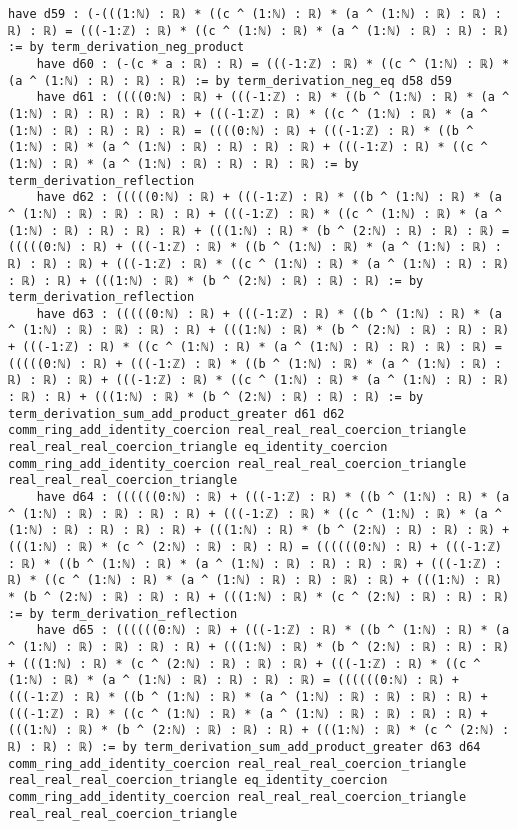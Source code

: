 \documentclass{article}
\begin{document}
\begin{tcolorbox}[colback=white!10, width=\linewidth]
\begin{lstlisting}[language=Lean4]
    have d59 : (-(((1:ℕ) : ℝ) * ((c ^ (1:ℕ) : ℝ) * (a ^ (1:ℕ) : ℝ) : ℝ) : ℝ) : ℝ) = (((-1:ℤ) : ℝ) * ((c ^ (1:ℕ) : ℝ) * (a ^ (1:ℕ) : ℝ) : ℝ) : ℝ) := by term_derivation_neg_product
    have d60 : (-(c * a : ℝ) : ℝ) = (((-1:ℤ) : ℝ) * ((c ^ (1:ℕ) : ℝ) * (a ^ (1:ℕ) : ℝ) : ℝ) : ℝ) := by term_derivation_neg_eq d58 d59
    have d61 : ((((0:ℕ) : ℝ) + (((-1:ℤ) : ℝ) * ((b ^ (1:ℕ) : ℝ) * (a ^ (1:ℕ) : ℝ) : ℝ) : ℝ) : ℝ) + (((-1:ℤ) : ℝ) * ((c ^ (1:ℕ) : ℝ) * (a ^ (1:ℕ) : ℝ) : ℝ) : ℝ) : ℝ) = ((((0:ℕ) : ℝ) + (((-1:ℤ) : ℝ) * ((b ^ (1:ℕ) : ℝ) * (a ^ (1:ℕ) : ℝ) : ℝ) : ℝ) : ℝ) + (((-1:ℤ) : ℝ) * ((c ^ (1:ℕ) : ℝ) * (a ^ (1:ℕ) : ℝ) : ℝ) : ℝ) : ℝ) := by term_derivation_reflection
    have d62 : (((((0:ℕ) : ℝ) + (((-1:ℤ) : ℝ) * ((b ^ (1:ℕ) : ℝ) * (a ^ (1:ℕ) : ℝ) : ℝ) : ℝ) : ℝ) + (((-1:ℤ) : ℝ) * ((c ^ (1:ℕ) : ℝ) * (a ^ (1:ℕ) : ℝ) : ℝ) : ℝ) : ℝ) + (((1:ℕ) : ℝ) * (b ^ (2:ℕ) : ℝ) : ℝ) : ℝ) = (((((0:ℕ) : ℝ) + (((-1:ℤ) : ℝ) * ((b ^ (1:ℕ) : ℝ) * (a ^ (1:ℕ) : ℝ) : ℝ) : ℝ) : ℝ) + (((-1:ℤ) : ℝ) * ((c ^ (1:ℕ) : ℝ) * (a ^ (1:ℕ) : ℝ) : ℝ) : ℝ) : ℝ) + (((1:ℕ) : ℝ) * (b ^ (2:ℕ) : ℝ) : ℝ) : ℝ) := by term_derivation_reflection
    have d63 : (((((0:ℕ) : ℝ) + (((-1:ℤ) : ℝ) * ((b ^ (1:ℕ) : ℝ) * (a ^ (1:ℕ) : ℝ) : ℝ) : ℝ) : ℝ) + (((1:ℕ) : ℝ) * (b ^ (2:ℕ) : ℝ) : ℝ) : ℝ) + (((-1:ℤ) : ℝ) * ((c ^ (1:ℕ) : ℝ) * (a ^ (1:ℕ) : ℝ) : ℝ) : ℝ) : ℝ) = (((((0:ℕ) : ℝ) + (((-1:ℤ) : ℝ) * ((b ^ (1:ℕ) : ℝ) * (a ^ (1:ℕ) : ℝ) : ℝ) : ℝ) : ℝ) + (((-1:ℤ) : ℝ) * ((c ^ (1:ℕ) : ℝ) * (a ^ (1:ℕ) : ℝ) : ℝ) : ℝ) : ℝ) + (((1:ℕ) : ℝ) * (b ^ (2:ℕ) : ℝ) : ℝ) : ℝ) := by term_derivation_sum_add_product_greater d61 d62 comm_ring_add_identity_coercion real_real_real_coercion_triangle real_real_real_coercion_triangle eq_identity_coercion comm_ring_add_identity_coercion real_real_real_coercion_triangle real_real_real_coercion_triangle
    have d64 : ((((((0:ℕ) : ℝ) + (((-1:ℤ) : ℝ) * ((b ^ (1:ℕ) : ℝ) * (a ^ (1:ℕ) : ℝ) : ℝ) : ℝ) : ℝ) + (((-1:ℤ) : ℝ) * ((c ^ (1:ℕ) : ℝ) * (a ^ (1:ℕ) : ℝ) : ℝ) : ℝ) : ℝ) + (((1:ℕ) : ℝ) * (b ^ (2:ℕ) : ℝ) : ℝ) : ℝ) + (((1:ℕ) : ℝ) * (c ^ (2:ℕ) : ℝ) : ℝ) : ℝ) = ((((((0:ℕ) : ℝ) + (((-1:ℤ) : ℝ) * ((b ^ (1:ℕ) : ℝ) * (a ^ (1:ℕ) : ℝ) : ℝ) : ℝ) : ℝ) + (((-1:ℤ) : ℝ) * ((c ^ (1:ℕ) : ℝ) * (a ^ (1:ℕ) : ℝ) : ℝ) : ℝ) : ℝ) + (((1:ℕ) : ℝ) * (b ^ (2:ℕ) : ℝ) : ℝ) : ℝ) + (((1:ℕ) : ℝ) * (c ^ (2:ℕ) : ℝ) : ℝ) : ℝ) := by term_derivation_reflection
    have d65 : ((((((0:ℕ) : ℝ) + (((-1:ℤ) : ℝ) * ((b ^ (1:ℕ) : ℝ) * (a ^ (1:ℕ) : ℝ) : ℝ) : ℝ) : ℝ) + (((1:ℕ) : ℝ) * (b ^ (2:ℕ) : ℝ) : ℝ) : ℝ) + (((1:ℕ) : ℝ) * (c ^ (2:ℕ) : ℝ) : ℝ) : ℝ) + (((-1:ℤ) : ℝ) * ((c ^ (1:ℕ) : ℝ) * (a ^ (1:ℕ) : ℝ) : ℝ) : ℝ) : ℝ) = ((((((0:ℕ) : ℝ) + (((-1:ℤ) : ℝ) * ((b ^ (1:ℕ) : ℝ) * (a ^ (1:ℕ) : ℝ) : ℝ) : ℝ) : ℝ) + (((-1:ℤ) : ℝ) * ((c ^ (1:ℕ) : ℝ) * (a ^ (1:ℕ) : ℝ) : ℝ) : ℝ) : ℝ) + (((1:ℕ) : ℝ) * (b ^ (2:ℕ) : ℝ) : ℝ) : ℝ) + (((1:ℕ) : ℝ) * (c ^ (2:ℕ) : ℝ) : ℝ) : ℝ) := by term_derivation_sum_add_product_greater d63 d64 comm_ring_add_identity_coercion real_real_real_coercion_triangle real_real_real_coercion_triangle eq_identity_coercion comm_ring_add_identity_coercion real_real_real_coercion_triangle real_real_real_coercion_triangle

\end{lstlisting}
\end{tcolorbox}
\end{document}
